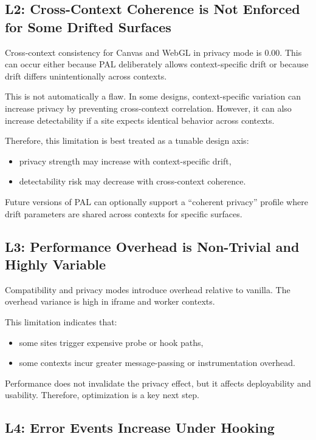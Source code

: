 \documentclass[11pt]{report}
\begin{document}
\subsection{L2: Cross-Context Coherence is Not Enforced for Some Drifted Surfaces}

Cross-context consistency for Canvas and WebGL in privacy mode is $0.00$. This can occur either because PAL deliberately allows context-specific drift or because drift differs unintentionally across contexts.

This is not automatically a flaw. In some designs, context-specific variation can increase privacy by preventing cross-context correlation. However, it can also increase detectability if a site expects identical behavior across contexts.

Therefore, this limitation is best treated as a tunable design axis:
\begin{itemize}
    \item privacy strength may increase with context-specific drift,
    \item detectability risk may decrease with cross-context coherence.
\end{itemize}

Future versions of PAL can optionally support a ``coherent privacy'' profile where drift parameters are shared across contexts for specific surfaces.

\subsection{L3: Performance Overhead is Non-Trivial and Highly Variable}

Compatibility and privacy modes introduce overhead relative to vanilla. The overhead variance is high in iframe and worker contexts.

This limitation indicates that:
\begin{itemize}
    \item some sites trigger expensive probe or hook paths,
    \item some contexts incur greater message-passing or instrumentation overhead.
\end{itemize}

Performance does not invalidate the privacy effect, but it affects deployability and usability. Therefore, optimization is a key next step.

\subsection{L4: Error Events Increase Under Hooking}
\end{document}
